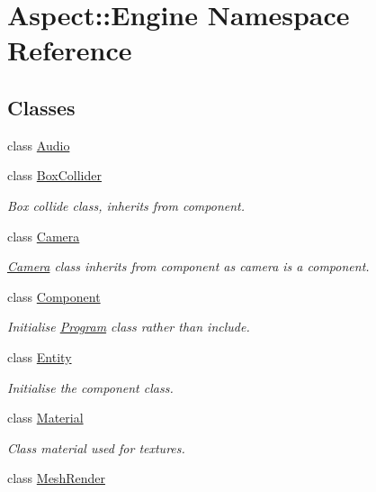 \hypertarget{namespace_aspect_1_1_engine}{}\section{Aspect\+:\+:Engine Namespace Reference}
\label{namespace_aspect_1_1_engine}
\subsection*{Classes}
\begin{DoxyCompactItemize}
\item 
class \mbox{\hyperlink{class_aspect_1_1_engine_1_1_audio}{Audio}}
\item 
class \mbox{\hyperlink{class_aspect_1_1_engine_1_1_box_collider}{Box\+Collider}}
\begin{DoxyCompactList}\small\item\em Box collide class, inherits from component. \end{DoxyCompactList}\item 
class \mbox{\hyperlink{class_aspect_1_1_engine_1_1_camera}{Camera}}
\begin{DoxyCompactList}\small\item\em \mbox{\hyperlink{class_aspect_1_1_engine_1_1_camera}{Camera}} class inherits from component as camera is a component. \end{DoxyCompactList}\item 
class \mbox{\hyperlink{class_aspect_1_1_engine_1_1_component}{Component}}
\begin{DoxyCompactList}\small\item\em Initialise \mbox{\hyperlink{class_aspect_1_1_engine_1_1_program}{Program}} class rather than include. \end{DoxyCompactList}\item 
class \mbox{\hyperlink{class_aspect_1_1_engine_1_1_entity}{Entity}}
\begin{DoxyCompactList}\small\item\em Initialise the component class. \end{DoxyCompactList}\item 
class \mbox{\hyperlink{class_aspect_1_1_engine_1_1_material}{Material}}
\begin{DoxyCompactList}\small\item\em Class material used for textures. \end{DoxyCompactList}\item 
class \mbox{\hyperlink{class_aspect_1_1_engine_1_1_mesh_render}{Mesh\+Render}}

\end{DoxyCompactItemize}
